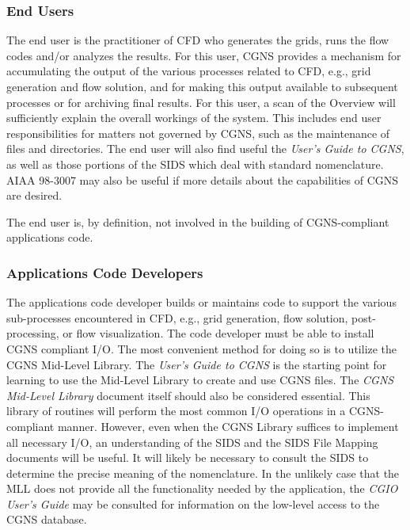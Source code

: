 \subsubsection{End Users}

The end user is the practitioner of CFD who generates the grids,
runs the flow codes and/or analyzes the results. For this user, CGNS
provides a mechanism for accumulating the output of the various
processes related to CFD, e.g., grid generation and flow solution,
and for making this output available to subsequent processes or for
archiving final results. For this user, a scan of the Overview will
sufficiently explain the overall workings of the system. This includes
end user responsibilities for matters not governed by CGNS, such as the
maintenance of files and directories. The end user will also find useful
the \textit{User's Guide to CGNS}, as well as
those portions of the SIDS which deal with standard nomenclature. AIAA
98-3007 may also be useful if more details about the capabilities of
CGNS are desired.

The end user is, by definition, not involved in the building of
CGNS-compliant applications code.

\subsubsection{Applications Code Developers}

The applications code developer builds or maintains code to support the
various sub-processes encountered in CFD, e.g., grid generation, flow
solution, post-processing, or flow visualization. The code developer
must be able to install CGNS compliant I/O. The most convenient method
for doing so is to utilize the CGNS Mid-Level Library.
The \textit{User's Guide to CGNS} is the starting point for learning to
use the Mid-Level Library to create and use CGNS files.
The \textit{CGNS Mid-Level Library} document itself should
also be considered essential.
This library of routines will perform the most common I/O operations in
a CGNS-compliant manner.
However, even when the CGNS Library suffices to implement all necessary
I/O, an understanding of the SIDS and the SIDS File Mapping documents
will be useful.
It will likely be necessary to consult the SIDS to determine the
precise meaning of the nomenclature.
In the unlikely case that the MLL does not provide all the
functionality needed by the application, the \textit{CGIO User's Guide}
may be consulted for information on the low-level access to the
CGNS database. 

